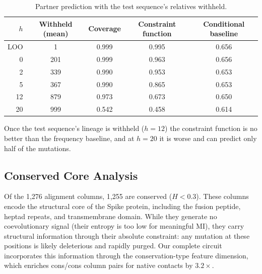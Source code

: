 \begin{table}[ht]
	\centering
	\caption{Partner prediction with the test sequence's relatives withheld.}
	\label{tab:spike-lineage-loo}
	\begin{tabular}{rcccc}
		\toprule
		$h$       & Withheld (mean) & Coverage & Constraint function & Conditional baseline \\
		\midrule
		LOO       & 1               & 0.999    & 0.995               & 0.656                \\
		0         & 201             & 0.999    & 0.963               & 0.656                \\
		2         & 339             & 0.990    & 0.953               & 0.653                \\
		5         & 367             & 0.990    & 0.865               & 0.653                \\
		12        & 879             & 0.973    & 0.673               & 0.650                \\
		20        & 999             & 0.542    & 0.458               & 0.614                \\
		\bottomrule
	\end{tabular}
\end{table}

Once the test sequence's lineage is withheld ($h = 12$) the constraint
function is no better than the frequency baseline, and at $h = 20$ it is
worse and can predict only half of the mutations.

\subsection{Conserved Core Analysis}
Of the 1{,}276 alignment columns, 1{,}255 are conserved ($H < 0.3$).  These
columns encode the structural core of the Spike protein, including the fusion
peptide, heptad repeats, and transmembrane domain.  While they generate no
coevolutionary signal (their entropy is too low for meaningful MI), they
carry structural information through their absolute constraint: any mutation
at these positions is likely deleterious and rapidly purged.  Our complete
circuit incorporates this information through the conservation-type feature
dimension, which enriches cons/cons column pairs for native contacts by
$3.2\times$.
